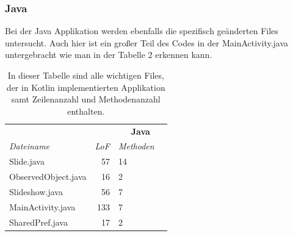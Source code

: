 \documentclass{sigchi-ext}
\begin{document}
\subsubsection{Java}
Bei der Java Applikation werden ebenfalls die spezifisch geänderten Files untersucht. Auch hier ist ein großer Teil des Codes in der MainActivity.java untergebracht wie man in der Tabelle 2 erkennen kann.

\begin{table}
  \centering
  \begin{tabular}{l r l l}
    & & \multicolumn{2}{c}{\small{\textbf{Java}}} \\
    \cmidrule(r){3-4}
    {\small\textit{Dateiname}}
    & {\small \textit{LoF}}
      & {\small \textit{Methoden}} \\
    \midrule
	Slide.java & 57 & 14\\
	ObservedObject.java & 16 & 2\\
	Slideshow.java & 56 & 7\\
	MainActivity.java & 133 & 	7\\
	SharedPref.java & 17 & 2\\
  \end{tabular}
  \caption{In dieser Tabelle sind alle wichtigen Files, der in Kotlin implementierten Applikation samt Zeilenanzahl und Methodenanzahl enthalten.   }~\label{tab:table2}
\end{table}
\end{document}
